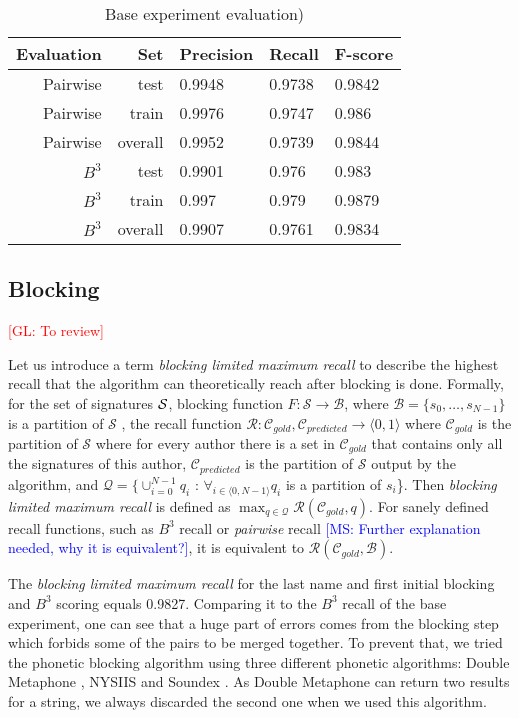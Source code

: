 \documentclass{article}
\newcommand{\glnote}[1]{\textcolor{red}{[GL: #1]}}
\newcommand{\msnote}[1]{\textcolor{blue}{[MS: #1]}}
\begin{document}
\begin{table}[H]
\caption{Base experiment evaluation)}
\centering
\begin{tabular}{|r|r|l|l|l|}
  \hline
  Evaluation & Set & Precision & Recall & F-score \\
  \hline
  Pairwise & test & 0.9948 & 0.9738 & 0.9842 \\
  \hline
  Pairwise & train & 0.9976 & 0.9747 & 0.986 \\
  \hline
  Pairwise & overall & 0.9952 & 0.9739 & 0.9844 \\
  \hline
  $B^3$ & test & 0.9901 & 0.976 & 0.983 \\
  \hline
  $B^3$ & train & 0.997 & 0.979 & 0.9879 \\
  \hline
  $B^3$ & overall & 0.9907 & 0.9761 & 0.9834 \\
  \hline
\end{tabular}
\end{table}

\subsection{Blocking}

\glnote{To review}

Let us introduce a term \textit{blocking limited maximum recall} to describe the highest
recall that the algorithm can theoretically reach after blocking is done.
Formally, for the set of signatures ${\cal S}$, blocking function $F: \mathcal{S}
\rightarrow \mathcal{B}$, where $ \mathcal{B} = \{s_{0}, \ldots{} , s_{N-1}\}$ is a
partition of $\mathcal{S} $ , the recall function $\mathcal{R}: \mathcal{C}_{gold},
\mathcal{C}_{predicted} \rightarrow \langle0,1\rangle$ where $\mathcal{C}_{gold}$ is the
partition of $\mathcal{S}$ where for every author there is a set in $\mathcal{C}_{gold}$
that contains only all the signatures of this author, $\mathcal{C}_{predicted}$ is the
partition of $\mathcal{S}$ output by the algorithm, and $\mathcal{Q} = \{\cup_{i=0}^{N-1}
q_i $ : $\forall_{i \in \langle0,N-1\rangle} q_i$ is a partition of $s_i$\}. Then
\textit{blocking limited maximum recall} is defined as $\max_{q \in \mathcal{Q}}
\mathcal{R}(\mathcal{C}_{gold}, q)$. For sanely defined recall functions, such as $B^{3}$
recall or \textit{pairwise} recall \msnote{Further explanation needed, why it is
equivalent?}, it is equivalent to $\mathcal{R}(\mathcal{C}_{gold}, \mathcal{B})$.

The \textit{blocking limited maximum recall} for the last name and first initial blocking
and $B^3$ scoring equals 0.9827. Comparing it to the $B^3$ recall of the base experiment,
one can see that a huge part of errors comes from the blocking step which forbids some of
the pairs to be merged together. To prevent that, we tried the phonetic blocking algorithm
using three different phonetic algorithms: Double Metaphone \citep{doublemetaphone}, NYSIIS
\citep{nysiis} and Soundex \citep{Soundex}. As Double Metaphone can return two results for a
string, we always discarded the second one when we used this algorithm.
\end{document}
